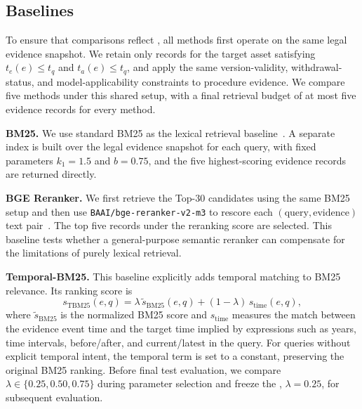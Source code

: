 \subsection{Baselines}
\label{sec:baselines}

To ensure that comparisons reflect , all methods first operate on the same legal evidence snapshot. We retain only records for the target asset satisfying
$t_e(e)\le t_q$ and $t_a(e)\le t_q$, and apply the same version-validity, withdrawal-status, and model-applicability constraints to procedure evidence. We compare five methods under this shared setup, with a final retrieval budget of at most five evidence records for every method.

\textbf{BM25.}
We use standard BM25 as the lexical retrieval baseline~\cite{robertson2009bm25}. A separate index is built over the legal evidence snapshot for each query, with fixed parameters $k_1=1.5$ and $b=0.75$, and the five highest-scoring evidence records are returned directly.

\textbf{BGE Reranker.}
We first retrieve the Top-30 candidates using the same BM25 setup and then use \texttt{BAAI/bge-reranker-v2-m3} to rescore each $(\text{query},\text{evidence})$ text pair~\cite{chen2024bgem3,flagembedding2026reranker}. The top five records under the reranking score are selected. This baseline tests whether a general-purpose semantic reranker can compensate for the limitations of purely lexical retrieval.

\textbf{Temporal-BM25.}
This baseline explicitly adds temporal matching to BM25 relevance. Its ranking score is
\begin{equation}
s_{\mathrm{TBM25}}(e,q)
=
\lambda\,\widetilde{s}_{\mathrm{BM25}}(e,q)
+
(1-\lambda)\,s_{\mathrm{time}}(e,q),
\end{equation}
where $\widetilde{s}_{\mathrm{BM25}}$ is the normalized BM25 score and $s_{\mathrm{time}}$ measures the match between the evidence event time and the target time implied by expressions such as years, time intervals, before/after, and current/latest in the query. For queries without explicit temporal intent, the temporal term is set to a constant, preserving the original BM25 ranking. %
Before final test evaluation, we compare $\lambda\in\{0.25,0.50,0.75\}$ during parameter selection and freeze the , $\lambda=0.25$, for subsequent evaluation.

